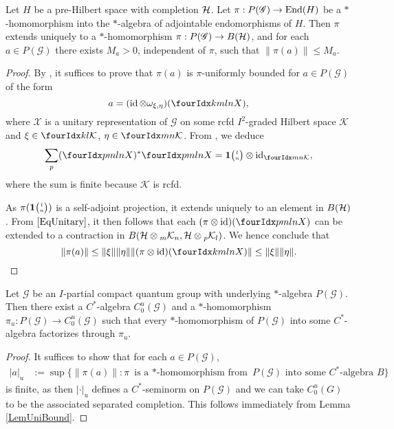 \begin{Lem}\label{LemUniBound}
 Let $H$ be a pre-Hilbert space with completion $\Hsp$. Let $\pi: P(\mathscr{G})\rightarrow \End(H)$ be a $*$-homomorphism into the $*$-algebra of adjointable endomorphisms of $H$. Then $\pi$ extends uniquely to a $*$-homomorphism $\pi: P(\mathscr{G})\rightarrow B(\Hsp)$, and for each $a\in P(\mathscr{G})$ there exists $M_a>0$, independent of $\pi$, such that $\|\pi(a)\|\leq M_a$.
\end{Lem} 

\begin{proof}
By \cite[Corollary 2.16 and Proposition 2.20]{DCT1}, it suffices to prove that $\pi(a)$ is $\pi$-uniformly bounded for $a\in P(\mathscr{G})$ of the form \[a=(\id \otimes \omega_{\xi,\eta})(\Gr{X}{k}{l}{m}{n}),\]
where $\mathscr{X}$ is a unitary representation of
$\mathscr{G}$ on some rcfd $I^{2}$-graded Hilbert space
$\mathcal{K}$ and $\xi\in \Gru{\mathcal{K}}{k}{l}$, $\eta\in
\Gru{\mathcal{K}}{m}{n}$.  From  \cite[Lemma 2.2]{DCT1}, we deduce
  \begin{equation}\label{EqUnitary}
    \sum_{p}(\Gr{X}{p}{l}{m}{n})^{*} \Gr{X}{p}{l}{m}{n}  = \UnitC{l}{n}
    \otimes \id_{\Gru{\mathcal{K}}{m}{n}},
  \end{equation}
where  the sum is  finite because $\mathcal{K}$ is rcfd. 

As $\pi(\UnitC{l}{n})$ is a self-adjoint projection, it extends uniquely to an element in $B(\Hsp)$. From  $\eqref{EqUnitary}$, it then follows that each $(\pi\otimes \id)(\Gr{X}{p}{l}{m}{n})$ can be extended to a contraction in $B(\Hsp\otimes \GrDA{\mathcal{K}}{m}{n},\Hsp\otimes \GrDA{\mathcal{K}}{p}{l})$. We hence conclude that
 \[\|\pi(a)\| \leq \| \xi\| \|\eta\| \|(\pi \otimes \id)(\Gr{X}{k}{l}{m}{n})\| \leq
    \|\xi\|\|\eta\| .\] 

\end{proof} 


\begin{Prop}
Let $\mathscr{G}$ be an $I$-partial compact quantum group with underlying
$*$-algebra $P(\mathscr{G})$. Then
  there exist a $C^{*}$-algebra $C^{u}_{0}(\mathscr{G})$ and a
  $*$-homomorphism $\pi_{u} \colon P(\mathscr{G}) \to
  C^{u}_{0}(\mathscr{G})$ such that every $*$-homomorphism of
  $P(\mathscr{G})$ into some $C^{*}$-algebra factorizes through
  $\pi_{u}$.
\end{Prop}
\begin{proof}
It suffices to show that for each $a \in P(\mathscr{G})$,
\begin{align*} 
  |a|_{u}&:= \sup \{ \|\pi(a)\| : \pi \text{ is a $*$-homomorphism from } P(\mathscr{G})
  \text{ into some $C^{*}$-algebra } B\}
\end{align*}
is finite, as then $|\cdot |_{u}$ defines a $C^{*}$-seminorm on
$P(\mathscr{G})$ and we can take $C^{u}_{0}(G)$ to be the associated
separated completion. This follows immediately from Lemma \ref{LemUniBound}.
\end{proof}

